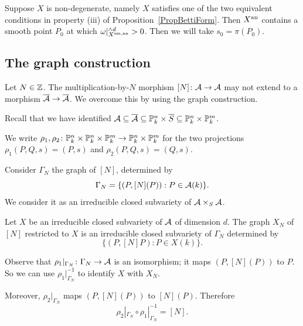 \begin{remark}
  \label{rmk:nondeg}
  Suppose $X$ is non-degenerate, namely $X$ satisfies one of the two
  equivalent conditions in property (iii) of
  Proposition~\ref{PropBettiForm}. Then ${X}^{\mathrm{an}}$ contains a smooth
  point $P_0$ at which $\omega|_{{X}^{\mathrm{sm,an}}}^{\wedge d}>0$. Then we will
  take $s_0=\pi(P_0)$.
\end{remark}



\subsection{The graph construction}
\label{ss:graph}

Let $N\in{\mathbb{Z}}$. The multiplication-by-$N$ morphism $[N] \colon \mathcal{A}\rightarrow \mathcal{A}$ may not
extend to a morphism $\overline{\mathcal{A}}\rightarrow \overline{\mathcal{A}}$. We
overcome this by using the graph construction.

Recall that we have identified
$\mathcal{A}\subseteq\overline{\mathcal{A}}\subseteq {\mathbb{P}}_k^n\times \overline{S}
\subseteq{\mathbb{P}}_k^n\times{\mathbb{P}}_k^m$. 

We write
$\rho_1,\rho_2\colon {\mathbb{P}}_k^n\times{\mathbb{P}}_k^n \times {\mathbb{P}}_k^m \rightarrow
{\mathbb{P}}_k^n\times {\mathbb{P}}_k^m$ for the
 two projections $\rho_1(P,Q,s)=(P,s)$ and $\rho_2(P,Q,s)=(Q,s)$.


Consider $\Gamma_N$ the graph of $[N]$, determined by 
\begin{equation*}
  \Gamma_N = \{ (P,[N](P)) : P \in \mathcal{A}(k) \}. 
\end{equation*}
We consider it as an irreducible closed subvariety of
$\mathcal{A}\times_S\mathcal{A}$. 

Let $X$ be an irreducible closed subvariety of $\mathcal{A}$ of dimension $d$. 
The graph $X_N$ of $[N]$ restricted to $X$ is
an irreducible closed  subvariety of $\Gamma_N$ determined by 
\begin{equation*}
   \{(P,[N]P): P \in X(k) \}.
\end{equation*}


Observe that $\rho_1|_{\Gamma_N} \colon \Gamma_N\rightarrow \mathcal{A}$ is an isomorphism; it maps $(P,[N](P))$ to $P$.  %
So we can use $\rho_1|_{\Gamma_N}^{-1}$ to identify $X$ with $X_N$.


Moreover, $\rho_2|_{\Gamma_N}$ maps $(P,[N](P))$ to $[N](P)$. Therefore
\begin{equation}
\label{eq:relatetoN}
  \rho_2|_{\Gamma_N} \circ \rho_1|_{\Gamma_N}^{-1} = [N].
\end{equation}


